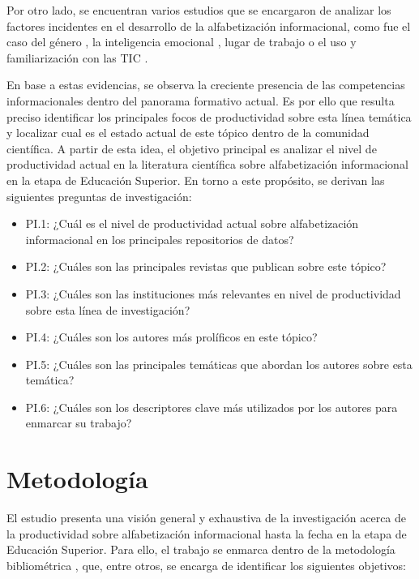 \documentclass[spanish]{textolivre}
\begin{document}
Por otro lado, se encuentran varios estudios que se encargaron de analizar los factores incidentes en el desarrollo de la alfabetización informacional, como fue el caso del género \cite{pinto2019}, %
la inteligencia emocional \cite{soroya2020}, %
lugar de trabajo \cite{ahmad2020} %
o el uso y familiarización con las TIC \cite{lorenz2019}. %

En base a estas evidencias, se observa la creciente presencia de las competencias informacionales dentro del panorama formativo actual. Es por ello que resulta preciso identificar los principales focos de productividad sobre esta línea temática y localizar cual es el estado actual de este tópico dentro de la comunidad científica. A partir de esta idea, el objetivo principal es analizar el nivel de productividad actual en la literatura científica sobre alfabetización informacional en la etapa de Educación Superior. En torno a este propósito, se derivan las siguientes preguntas de investigación:

\begin{itemize}
    \item PI.1: ¿Cuál es el nivel de productividad actual sobre alfabetización informacional en los principales repositorios de datos?
    \item PI.2: ¿Cuáles son las principales revistas que publican sobre este tópico?
    \item PI.3: ¿Cuáles son las instituciones más relevantes en nivel de productividad sobre esta línea de investigación?
    \item PI.4: ¿Cuáles son los autores más prolíficos en este tópico?
    \item PI.5: ¿Cuáles son las principales temáticas que abordan los autores sobre esta temática?
    \item PI.6: ¿Cuáles son los descriptores clave más utilizados por los autores para enmarcar su trabajo?
\end{itemize}

\section{Metodología}
El estudio presenta una visión general y exhaustiva de la investigación acerca de la productividad sobre alfabetización informacional hasta la fecha en la etapa de Educación Superior. Para ello, el trabajo se enmarca dentro de la metodología bibliométrica \cite{vaneck2014, cruz1999, fernandezcano1999}, %
que, entre otros, se encarga de identificar los siguientes objetivos:
\end{document}
